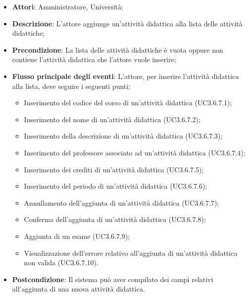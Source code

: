 \begin{itemize}
	\item \textbf{Attori}: Amministratore, Università;
	\item \textbf{Descrizione}: L'attore aggiunge un'attività didattica alla lista delle attività didattiche;
	
	\item \textbf{Precondizione}: La lista delle attività didattiche è vuota oppure non contiene l'attività didattica che l'attore vuole inserire;
	
	\item \textbf{Flusso principale degli eventi}: L'attore, per inserire l'attività didattica alla lista, deve seguire i seguenti punti:
	
	\begin{itemize}
		\item Inserimento del codice del corso di un'attività didattica (UC3.6.7.1);
		\item Inserimento del nome di un’attività didattica (UC3.6.7.2);
		\item Inserimento della descrizione di un'attività didattica (UC3.6.7.3);
		\item Inserimento del professore associato ad un'attività didattica (UC3.6.7.4);
		\item Inserimento dei crediti di un’attività didattica (UC3.6.7.5);
		\item Inserimento del periodo di un’attività didattica (UC3.6.7.6);
		\item Annullamento dell’aggiunta di un’attività didattica (UC3.6.7.7);
		\item Conferma dell’aggiunta di un’attività didattica (UC3.6.7.8);
		\item Aggiunta di un esame (UC3.6.7.9);
		\item Visualizzazione dell'errore relativo all’aggiunta di un’attività didattica non valida (UC3.6.7.10).
	\end{itemize}
	\item \textbf{Postcondizione}: Il sistema può aver compilato dei campi relativi all'aggiunta di una nuova attività didattica.
	
\end{itemize}
